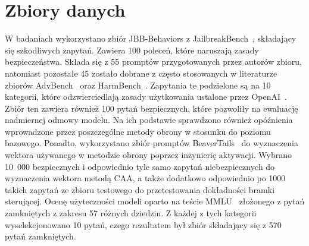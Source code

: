 \section{Zbiory danych}
W badaniach wykorzystano zbiór JBB-Behaviors z JailbreakBench~\cite{chao2024jailbreakbenchopenrobustnessbenchmark}, składający się szkodliwych zapytań. Zawiera 100 poleceń, które naruszają zasady bezpieczeństwa. Składa się z 55 promptów przygotowanych przez autorów zbioru, natomiast pozostałe 45 zostało dobrane z często stosowanych w literaturze zbiorów AdvBench~\cite{zou2023universaltransferableadversarialattacks} oraz HarmBench~\cite{mazeika2024harmbenchstandardizedevaluationframework}. Zapytania te podzielone są na 10 kategorii, które odzwierciedlają zasady użytkowania ustalone przez OpenAI~\cite{openai_usage_policy}.
Zbiór ten zawiera również 100 pytań bezpiecznych, które pozwoliły na ewaluację nadmiernej odmowy modelu. Na ich podstawie sprawdzono również opóźnienia wprowadzone przez poszczególne metody obrony w stosunku do poziomu bazowego.
Ponadto, wykorzystano zbiór promptów BeaverTails~\cite{ji2023beavertailsimprovedsafetyalignment} do wyznaczenia wektora używanego w metodzie obrony poprzez inżynierię aktywacji. Wybrano 10~000 bezpiecznych i odpowiednio tyle samo zapytań niebezpiecznych do wyznaczenia wektora metodą \gls{CAA}, a także dodatkowo odpowiednio po 1000 takich zapytań ze zbioru testowego do przetestowania dokładności bramki sterującej. Ocenę użyteczności modeli oparto na teście MMLU~\cite{hendrycks2021measuringmassivemultitasklanguage} złożonego z pytań zamkniętych z zakresu 57 różnych dziedzin. Z każdej z tych kategorii wyselekcjonowano 10 pytań, czego rezultatem był zbiór składający się z 570 pytań zamkniętych.